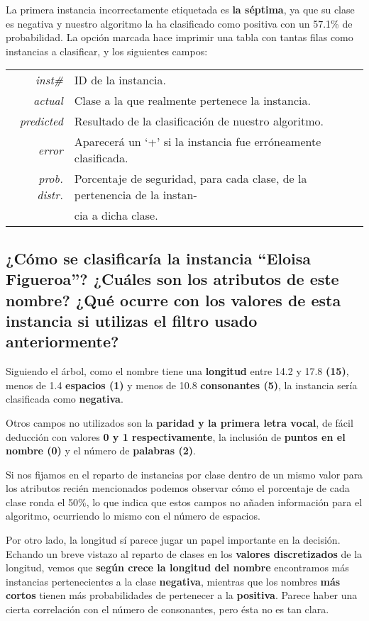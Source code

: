 \documentclass[12pt]{article}
\begin{document}
La primera instancia incorrectamente etiquetada es \textbf{la séptima}, ya que
su clase es negativa y nuestro algoritmo la ha clasificado como positiva con un
57.1\% de probabilidad. La opción marcada hace imprimir una tabla con tantas
filas como instancias a clasificar, y los siguientes campos:

\begin{tabular}{rl}
    \emph{inst\#} & ID de la instancia.\\
    \emph{actual} & Clase a la que realmente pertenece la instancia.\\
    \emph{predicted} & Resultado de la clasificación de nuestro algoritmo.\\
    \emph{error} & Aparecerá un `+' si la instancia fue erróneamente
    clasificada.\\
    \emph{prob. distr.} & Porcentaje de seguridad, para cada clase, de la
    pertenencia de la instan- \\ &cia a dicha clase.
\end{tabular}

\subsection*{\small ¿Cómo se clasificaría la instancia ``Eloisa Figueroa''?
¿Cuáles son los atributos de este nombre? ¿Qué ocurre con los valores de esta
instancia si utilizas el filtro usado anteriormente?}

Siguiendo el árbol, como el nombre tiene una \textbf{longitud} entre 14.2 y
17.8 \textbf{(15)}, menos de 1.4 \textbf{espacios (1)} y menos de 10.8
\textbf{consonantes (5)}, la instancia sería clasificada como \textbf{negativa}.

Otros campos no utilizados son la \textbf{paridad y la primera letra vocal}, de
fácil deducción con valores \textbf{0 y 1 respectivamente}, la inclusión de
\textbf{puntos en el nombre (0)} y el número de \textbf{palabras (2)}.

Si nos fijamos en el reparto de instancias por clase dentro de un mismo valor
para los atributos recién mencionados podemos observar cómo el porcentaje de
cada clase ronda el 50\%, lo que indica que estos campos no añaden información
para el algoritmo, ocurriendo lo mismo con el número de espacios.

Por otro lado, la longitud sí parece jugar un papel importante en la decisión.
Echando un breve vistazo al reparto de clases en los \textbf{valores
discretizados} de la longitud, vemos que \textbf{según crece la longitud del
nombre} encontramos más instancias pertenecientes a la clase \textbf{negativa},
mientras que los nombres \textbf{más cortos} tienen más probabilidades de
pertenecer a la \textbf{positiva}. Parece haber una cierta correlación con el
número de consonantes, pero ésta no es tan clara.
\end{document}

